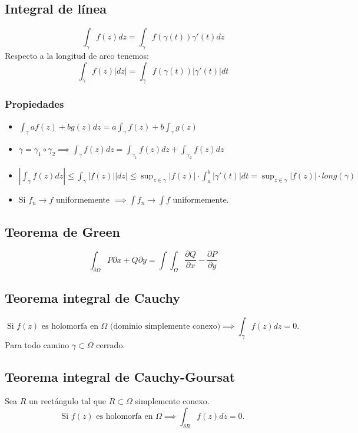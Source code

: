 \documentclass[paper=a4, fontsize=11pt]{scrartcl}
\numberwithin{equation}{section}
\numberwithin{figure}{section}
\numberwithin{table}{section}
\begin{document}
\subsection{Integral de línea}
$$\int_\gamma f(z)dz = \int_\gamma f(\gamma(t))\gamma'(t)dz$$
Respecto a la longitud de arco tenemos:
$$\int_\gamma f(z)|dz| = \int_\gamma f(\gamma(t))|\gamma'(t)|dt$$
\subsubsection{Propiedades}
\begin{itemize}
\item $\int_\gamma af(z)+bg(z)dz = a\int_\gamma f(z) + b\int_\gamma g(z)$
\item $\gamma = \gamma_1 \circ \gamma_2 \implies \int_\gamma f(z)dz = \int_{\gamma_1} f(z)dz + \int_{\gamma_2} f(z)dz$
\item $\boxed{\left|\int_\gamma f(z)dz\right| \le \int_\gamma |f(z)||dz| \le \sup_{z\in\gamma}\left|f(z)\right|\cdot \int_a^b|\gamma'(t)|dt = \sup_{z\in\gamma}\left|f(z)\right|\cdot long(\gamma)}$
\item Si ${f_n}\to f$ uniformemente $\implies \int f_n \to \int f$ uniformemente.
\end{itemize}

\subsection{Teorema de Green}
$$\int_{\delta\Omega} P \partial x+Q\partial y = \int\int_\Omega \frac{\partial Q}{\partial x} - \frac{\partial P}{\partial y} $$

\subsection{Teorema integral de Cauchy}
$$\text{Si }f(z)\text{ es holomorfa en }\Omega\text{ (dominio simplemente conexo)} \implies \int_{\gamma} f(z)dz = 0.$$ Para todo camino $\gamma\subset\Omega$ cerrado.

\subsection{Teorema integral de Cauchy-Goursat}
Sea $R$ un rectángulo tal que $R\subset\Omega$ simplemente conexo.
$$\text{Si }f(z)\text{ es holomorfa en }\Omega \implies \int_{\delta R} f(z)dz = 0.$$
\end{document}
